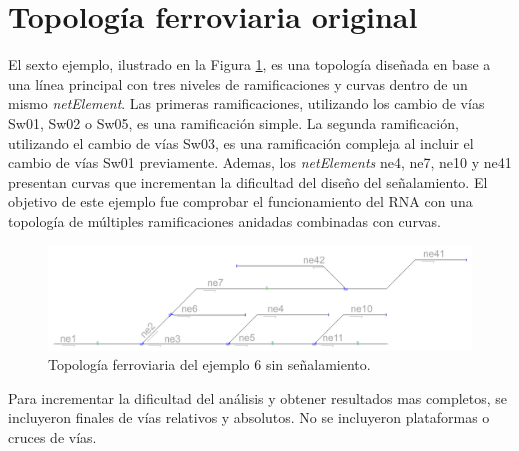 \section{Topología ferroviaria original}

	El sexto ejemplo, ilustrado en la Figura \ref{fig:EJ6_1}, es una topología diseñada en base a una línea principal con tres niveles de ramificaciones y curvas dentro de un mismo \textit{netElement}. Las primeras ramificaciones, utilizando los cambio de vías Sw01, Sw02 o Sw05, es una ramificación simple. La segunda ramificación, utilizando el cambio de vías Sw03, es una ramificación compleja al incluir el cambio de vías Sw01 previamente. Ademas, los \textit{netElements} ne4, ne7, ne10 y ne41 presentan curvas que incrementan la dificultad del diseño del señalamiento. El objetivo de este ejemplo fue comprobar el funcionamiento del RNA con una topología de múltiples ramificaciones anidadas combinadas con curvas.
	
	\begin{figure}[h]
		\centering
		\includegraphics[width=1\textwidth]{resultados-obtenidos/ejemplo6/images/6_empty.png}
		\centering\caption{Topología ferroviaria del ejemplo 6 sin señalamiento.}
		\label{fig:EJ6_1}
	\end{figure}
	
	Para incrementar la dificultad del análisis y obtener resultados mas completos, se incluyeron finales de vías relativos y absolutos. No se incluyeron plataformas o cruces de vías.
